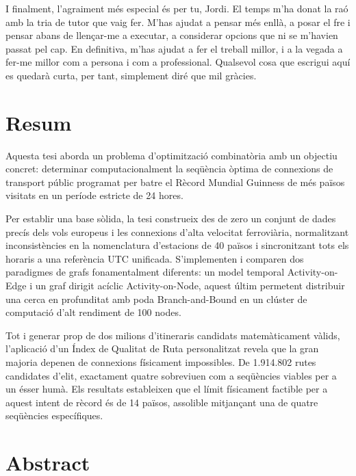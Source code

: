 \documentclass[11pt, a4paper,twoside,openany]{tfg_dtic_upf}
\let\cleardoublepage\clearpage
\numberwithin{equation}{section}
\begin{document}
\medskip

I finalment, l'agraiment més especial és per tu, Jordi. El temps m'ha donat la raó amb la tria de tutor que vaig fer. M'has ajudat a pensar més enllà, a  posar el fre i pensar abans de llençar-me a executar, a considerar opcions que ni se m'havien passat pel cap. En definitiva, m'has ajudat a fer el treball millor, i a la vegada a fer-me millor com a persona i com a professional. Qualsevol cosa que escrigui aquí es quedarà curta, per tant, simplement diré que mil gràcies. 
\cleardoublepage


\section*{\Large \sffamily Resum}
Aquesta tesi aborda un problema d'optimització combinatòria amb un objectiu concret: determinar computacionalment la seqüència òptima de connexions de transport públic programat per batre el Rècord Mundial Guinness de més països visitats en un període estricte de 24 hores.

Per establir una base sòlida, la tesi construeix des de zero un conjunt de dades precís dels vols europeus i les connexions d'alta velocitat ferroviària, normalitzant inconsistències en la nomenclatura d'estacions de 40 països i sincronitzant tots els horaris a una referència UTC unificada. S'implementen i comparen dos paradigmes de grafs fonamentalment diferents: un model temporal Activity-on-Edge i un graf dirigit acíclic Activity-on-Node, aquest últim permetent distribuir una cerca en profunditat amb poda Branch-and-Bound en un clúster de computació d'alt rendiment de 100 nodes.

Tot i generar prop de dos milions d'itineraris candidats matemàticament vàlids, l'aplicació d'un Índex de Qualitat de Ruta personalitzat revela que la gran majoria depenen de connexions físicament impossibles. De 1.914.802 rutes candidates d'elit, exactament quatre sobreviuen com a seqüències viables per a un ésser humà. Els resultats estableixen que el límit físicament factible per a aquest intent de rècord és de 14 països, assolible mitjançant una de quatre seqüències específiques.

\section*{\Large \sffamily  Abstract}
\end{document}
